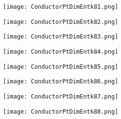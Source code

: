 \documentclass[pdf]{beamer}
\begin{document}
\begin{frame}
\begin{figure}[!h]
\centering
\texttt{[image: ConductorPtDimEntk81.png]}
\end{figure}
\end{frame}

\begin{frame}
\begin{figure}[!h]
\centering
\texttt{[image: ConductorPtDimEntk82.png]}
\end{figure}
\end{frame}

\begin{frame}
\begin{figure}[!h]
\centering
\texttt{[image: ConductorPtDimEntk83.png]}
\end{figure}
\end{frame}

\begin{frame}
\begin{figure}[!h]
\centering
\texttt{[image: ConductorPtDimEntk84.png]}
\end{figure}
\end{frame}

\begin{frame}
\begin{figure}[!h]
\centering
\texttt{[image: ConductorPtDimEntk85.png]}
\end{figure}
\end{frame}

\begin{frame}
\begin{figure}[!h]
\centering
\texttt{[image: ConductorPtDimEntk86.png]}
\end{figure}
\end{frame}

\begin{frame}
\begin{figure}[!h]
\centering
\texttt{[image: ConductorPtDimEntk87.png]}
\end{figure}
\end{frame}

\begin{frame}
\begin{figure}[!h]
\centering
\texttt{[image: ConductorPtDimEntk88.png]}
\end{figure}
\end{frame}
\end{document}
